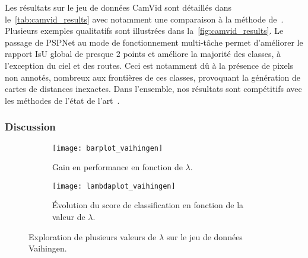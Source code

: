 Les résultats sur le jeu de données CamVid sont détaillés dans le~\cref{tab:camvid_results} avec notamment une comparaison à la méthode de~\cite{jegou_one_2017}. Plusieurs exemples qualitatifs sont illustrées dans la~\cref{fig:camvid_results}. Le passage de PSPNet au mode de fonctionnement multi-tâche permet d'améliorer le rapport \gls{IsU} global de presque 2 points et améliore la majorité des classes, à l'exception du ciel et des routes. Ceci est notamment dû à la présence de pixels non annotés, nombreux aux frontières de ces classes, provoquant la génération de cartes de distances inexactes. Dans l'ensemble, nos résultats sont compétitifs avec les méthodes de l'état de l'art~\cite{jegou_one_2017,l._c._chen_deeplab_2018}.

\subsubsection{Discussion}


\begin{figure}[!t]
	\captionsetup[subfigure]{position=b}
	\begin{subfigure}{0.49\linewidth}
    \texttt{[image: barplot\_vaihingen]}
    \caption{Gain en performance en fonction de $\lambda$.}
    \end{subfigure}
    \hfill
    \begin{subfigure}{0.49\linewidth}
    \texttt{[image: lambdaplot\_vaihingen]}
    \caption{Évolution du score de classification en fonction de la valeur de $\lambda$.}
    \end{subfigure}
    \caption{Exploration de plusieurs valeurs de $\lambda$ sur le jeu de données  Vaihingen.}
    \label{fig:lambda_space}
\end{figure}

